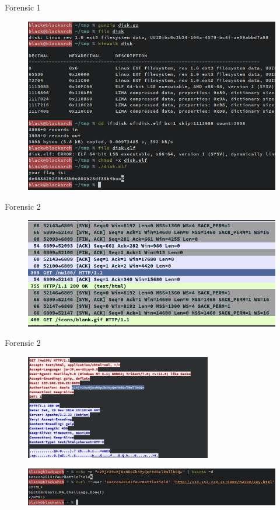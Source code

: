 \documentclass[compress]{beamer}
\begin{document}
\begin{frame}{Forensic 1}
	\begin{figure}
		\centering
		\includegraphics[width=\textwidth]{images/f1.png}
	\end{figure}
\end{frame}

\begin{frame}{Forensic 2}
	\begin{figure}
		\centering
		\includegraphics[width=\linewidth]{images/f21.png}
	\end{figure}
\end{frame}

\begin{frame}{Forensic 2}
	\begin{figure}
		\centering
		\includegraphics[width=\textwidth,height=1.8in]{images/f22.png}
	\end{figure}
	\begin{figure}
		\centering
		\includegraphics[width=\textwidth]{images/f23.png}
	\end{figure}    
\end{frame}
\end{document}
